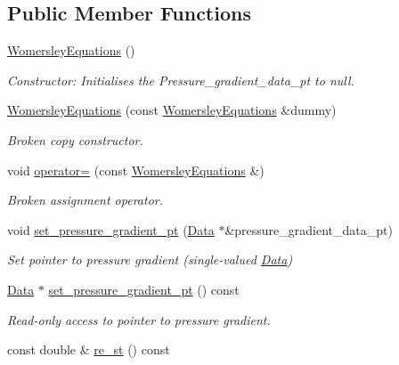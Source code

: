 \subsection*{Public Member Functions}
\begin{DoxyCompactItemize}
\item 
\hyperlink{classoomph_1_1WomersleyEquations_a22ad21d028f961d08c2ec17ed59bd88b}{Womersley\+Equations} ()
\begin{DoxyCompactList}\small\item\em Constructor\+: Initialises the Pressure\+\_\+gradient\+\_\+data\+\_\+pt to null. \end{DoxyCompactList}\item 
\hyperlink{classoomph_1_1WomersleyEquations_aed4568c1736e6027eb111d090b4cb5e9}{Womersley\+Equations} (const \hyperlink{classoomph_1_1WomersleyEquations}{Womersley\+Equations} \&dummy)
\begin{DoxyCompactList}\small\item\em Broken copy constructor. \end{DoxyCompactList}\item 
void \hyperlink{classoomph_1_1WomersleyEquations_a429ed0a68543a77c4182fa977ffe549c}{operator=} (const \hyperlink{classoomph_1_1WomersleyEquations}{Womersley\+Equations} \&)
\begin{DoxyCompactList}\small\item\em Broken assignment operator. \end{DoxyCompactList}\item 
void \hyperlink{classoomph_1_1WomersleyEquations_ada82ee649d9a6d7469166fd497222594}{set\+\_\+pressure\+\_\+gradient\+\_\+pt} (\hyperlink{classoomph_1_1Data}{Data} $\ast$\&pressure\+\_\+gradient\+\_\+data\+\_\+pt)
\begin{DoxyCompactList}\small\item\em Set pointer to pressure gradient (single-\/valued \hyperlink{classoomph_1_1Data}{Data}) \end{DoxyCompactList}\item 
\hyperlink{classoomph_1_1Data}{Data} $\ast$ \hyperlink{classoomph_1_1WomersleyEquations_a72c6fc82b100bd997a6d707d8bccd9d2}{set\+\_\+pressure\+\_\+gradient\+\_\+pt} () const
\begin{DoxyCompactList}\small\item\em Read-\/only access to pointer to pressure gradient. \end{DoxyCompactList}\item 
const double \& \hyperlink{classoomph_1_1WomersleyEquations_a4db194b9f71a69779b3450d40288b55d}{re\+\_\+st} () const

\end{DoxyCompactItemize}
